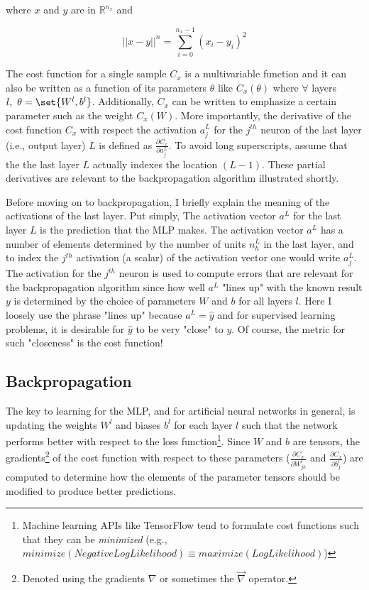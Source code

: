 \documentclass{article}
\DeclarePairedDelimiter\set\{\}
\begin{document}
where $x$ and $y$ are in $\mathbb{R}^{n_x}$ and

\begin{equation}
	||x - y||^{n} = \sum_{i=0}^{n_{x}-1} { (x_{i} - y_{i})^{2} }
\end{equation}

The cost function for a single sample $C_x$ is a multivariable function
and it can also be written as a function of its parameters $\theta$ like
$C_x(\theta)$ where $\forall$ layers $l,\ \theta = \set{W^{l}, b^{l}}$. Additionally,
$C_x$ can be written to emphasize a certain parameter such as the weight $C_x(W)$.
More importantly, the derivative of the cost function $C_x$ with respect the activation
$a_j^{L}$ for the $j^{th}$ neuron of the last layer (i.e., output layer) $L$ is defined as
$\frac{\partial C_x}{\partial a_j^{L}}$. To avoid long superscripts, assume
that the the last layer $L$ actually indexes the location $(L-1)$.
These partial derivatives are relevant to the backpropagation algorithm illustrated shortly.

Before moving on to backpropagation, I briefly explain the meaning of the activations
of the last layer. Put simply, The activation vector $a^{L}$ for the last layer $L$ is the prediction
that the MLP makes. The activation vector $a^{L}$ has a number of elements
determined by the number of units $n_h^{L}$ in the last layer, and to index the $j^{th}$
activation (a scalar) of the activation vector one would write $a_j^{L}$. The activation for
the $j^{th}$ neuron is used to compute errors that are relevant for the
backpropagation algorithm since how well $a^{L}$ "lines up" with the known
result $y$ is determined by the choice of parameters $W$ and $b$ for all layers $l$.
Here I loosely use the phrase "lines up" because $a^{L} = \hat{y}$ and for supervised
learning problems, it is desirable for $\hat{y}$ to be very "close" to $y$. Of
course, the metric for such "closeness" is the cost function!

\subsection{Backpropagation}

The key to learning for the MLP, and for artificial neural networks in general,
is updating the weights $W^{l}$ and biases $b^{l}$ for each layer $l$ such
that the network performs better with respect to the loss function\footnote{
Machine learning APIs like TensorFlow tend to formulate cost functions
such that they can be \textit{minimized} (e.g.,
$minimize(NegativeLogLikelihood) \equiv maximize(LogLikelihood)$)}.
Since $W$ and $b$ are tensors, the gradients\footnote{Denoted
	using the gradients $\nabla$ or sometimes the $\vec{\nabla}$ operator.}
of the cost function with respect to these parameters ($\frac{\partial C_x}{\partial W_{jk}^{l}}$
and $\frac{\partial C_x}{\partial b_{j}^{l}}$) are computed to determine how
the elements of the parameter tensors should be modified to produce better predictions.
\end{document}
